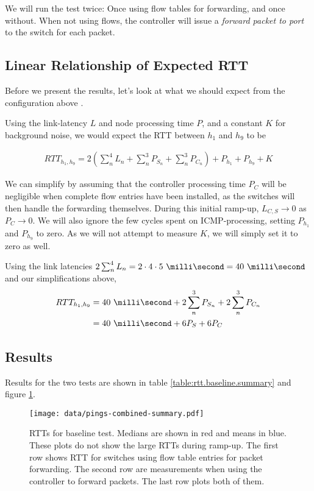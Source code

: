 We will run the test twice: Once using flow tables for forwarding, and once
without.  When not using flows, the controller will issue a \textit{forward
packet to port} to the switch for each packet.

\subsection{Linear Relationship of Expected \acs{RTT}}

Before we present the results, let's look at what we should expect from the
configuration above \cite{DBLP:conf/cnsm/PhemiusB13}.

Using the link-latency $L$ and node
processing time $P$, and a constant $K$ for
background noise, we would expect the \acf{RTT}
between $h_1$ and $h_9$ to be

\begin{gather}
  RTT_{h_1, h_9} = 2\left( \sum_n^4 L_n + \sum_n^3 P_{S_n} + \sum_n^3 P_{C_n} \right) + P_{h_1} + P_{h_9} + K
  \label{equation:baseline.rtt}
\end{gather}

We can simplify by assuming that the controller processing time $P_C$ will
be negligible when complete flow entries have been installed, as the
switches will then handle the forwarding themselves.  During this initial
ramp-up, $L_{C,S} \to 0$ as $P_C \to 0$.  We will also ignore the few
cycles spent on ICMP-processing, setting $P_{h_1}$ and $P_{h_9}$ to zero.
As we will not attempt to measure $K$, we will simply set it to zero as
well.

Using the link latencies $2\sum_n^4 L_n = 2\cdot4\cdot\ms{5} = \ms{40}$
and our simplifications above,
\begin{align}
  RTT_{h_1,h_9} &= \ms{40} + 2\sum_n^3 P_{S_n} + 2\sum_n^3 P_{C_n} \\
                &= \ms{40} + 6P_S + 6P_C
  \label{equation:expected.baseline.rtt}
\end{align}

\subsection{Results}

Results for the two tests are shown in table
\ref{table:rtt.baseline.summary} and figure
\ref{figure:baseline.combined.summary.plot}.

\begin{figure}
  \centering
  \texttt{[image: data/pings-combined-summary.pdf]}
  \caption{\acs{RTT}s for baseline test.  Medians are shown in red and means
    in blue.
    These plots do not show the large \acs{RTT}s during ramp-up.
    The first row shows \acs{RTT} for switches using flow table entries for
    packet forwarding.  The second row are measurements when using the
    controller to forward packets.  The last row plots both of them.}
  \label{figure:baseline.combined.summary.plot}
\end{figure}

